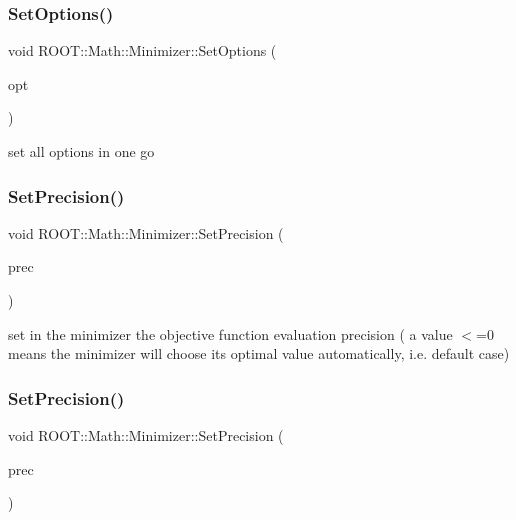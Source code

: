 \subsubsection{\texorpdfstring{SetOptions()}{SetOptions()}\hspace{0.1cm}{\footnotesize\ttfamily [2/2]}}
{\footnotesize\ttfamily void R\+O\+O\+T\+::\+Math\+::\+Minimizer\+::\+Set\+Options (\begin{DoxyParamCaption}\item[{const Minimizer\+Options \&}]{opt }\end{DoxyParamCaption})\hspace{0.3cm}{\ttfamily [inline]}}



set all options in one go 

\mbox{\label{classROOT_1_1Math_1_1Minimizer_a96160fe12f3cddf6ca0668ddb4a585bc}} 
\subsubsection{\texorpdfstring{SetPrecision()}{SetPrecision()}\hspace{0.1cm}{\footnotesize\ttfamily [1/2]}}
{\footnotesize\ttfamily void R\+O\+O\+T\+::\+Math\+::\+Minimizer\+::\+Set\+Precision (\begin{DoxyParamCaption}\item[{double}]{prec }\end{DoxyParamCaption})\hspace{0.3cm}{\ttfamily [inline]}}

set in the minimizer the objective function evaluation precision ( a value $<$=0 means the minimizer will choose its optimal value automatically, i.\+e. default case) \mbox{\label{classROOT_1_1Math_1_1Minimizer_a96160fe12f3cddf6ca0668ddb4a585bc}} 
\subsubsection{\texorpdfstring{SetPrecision()}{SetPrecision()}\hspace{0.1cm}{\footnotesize\ttfamily [2/2]}}
{\footnotesize\ttfamily void R\+O\+O\+T\+::\+Math\+::\+Minimizer\+::\+Set\+Precision (\begin{DoxyParamCaption}\item[{double}]{prec }\end{DoxyParamCaption})\hspace{0.3cm}{\ttfamily [inline]}}

